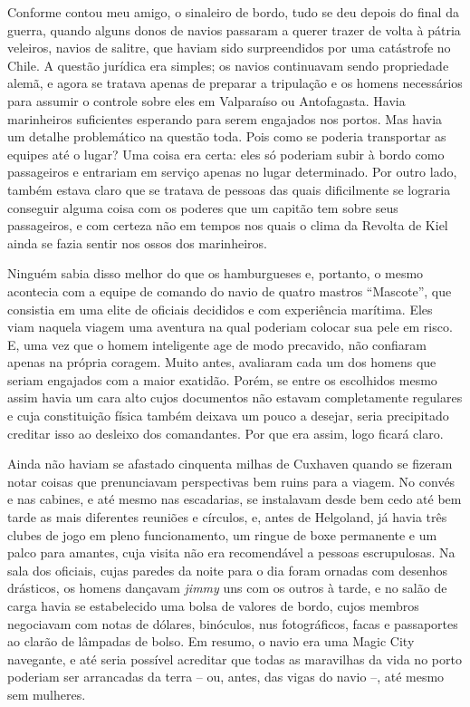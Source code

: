 Conforme contou meu amigo, o sinaleiro de bordo, tudo se deu depois do
final da guerra, quando alguns donos de navios passaram a querer trazer
de volta à pátria veleiros, navios de salitre, que haviam sido
surpreendidos por uma catástrofe no Chile. A questão jurídica era
simples; os navios continuavam sendo propriedade alemã, e agora se
tratava apenas de preparar a tripulação e os homens necessários para
assumir o controle sobre eles em Valparaíso ou Antofagasta. Havia
marinheiros suficientes esperando para serem engajados nos portos. Mas
havia um detalhe problemático na questão toda. Pois como se poderia
transportar as equipes até o lugar? Uma coisa era certa: eles só
poderiam subir à bordo como passageiros e entrariam em serviço apenas no
lugar determinado. Por outro lado, também estava claro que se tratava de
pessoas das quais dificilmente se lograria conseguir alguma coisa com os
poderes que um capitão tem sobre seus passageiros, e com certeza não em
tempos nos quais o clima da Revolta de Kiel ainda se fazia sentir nos
ossos dos marinheiros.

Ninguém sabia disso melhor do que os hamburgueses e, portanto, o mesmo
acontecia com a equipe de comando do navio de quatro mastros
``Mascote'', que consistia em uma elite de oficiais decididos e com
experiência marítima. Eles viam naquela viagem uma aventura na qual
poderiam colocar sua pele em risco. E, uma vez que o homem inteligente
age de modo precavido, não confiaram apenas na própria coragem. Muito
antes, avaliaram cada um dos homens que seriam engajados com a maior
exatidão. Porém, se entre os escolhidos mesmo assim havia um cara alto
cujos documentos não estavam completamente regulares e cuja constituição
física também deixava um pouco a desejar, seria precipitado creditar
isso ao desleixo dos comandantes. Por que era assim, logo ficará claro.

Ainda não haviam se afastado cinquenta milhas de Cuxhaven quando se
fizeram notar coisas que prenunciavam perspectivas bem ruins para a
viagem. No convés e nas cabines, e até mesmo nas escadarias, se
instalavam desde bem cedo até bem tarde as mais diferentes reuniões e
círculos, e, antes de Helgoland, já havia três clubes de jogo em pleno
funcionamento, um ringue de boxe permanente e um palco para amantes,
cuja visita não era recomendável a pessoas escrupulosas. Na sala dos
oficiais, cujas paredes da noite para o dia foram ornadas com desenhos
drásticos, os homens dançavam \emph{jimmy} uns com os outros à tarde, e
no salão de carga havia se estabelecido uma bolsa de valores de bordo,
cujos membros negociavam com notas de dólares, binóculos, nus
fotográficos, facas e passaportes ao clarão de lâmpadas de bolso. Em
resumo, o navio era uma Magic City navegante, e até seria possível
acreditar que todas as maravilhas da vida no porto poderiam ser
arrancadas da terra -- ou, antes, das vigas do navio --, até mesmo sem
mulheres.

